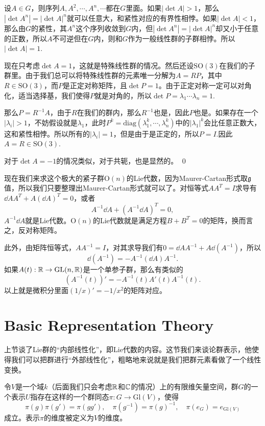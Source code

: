 \proof 设$A\in G$，则序列$A,A^2,\cdots,A^n,\cdots$都在$G$里面。如果$|\det A|>1$，那么$|\det A^n|=|\det A|^n$就可以任意大，和紧性对应的有界性相悖。如果$|\det A|<1$，那么由$G$的紧性，其$A^n$这个序列收敛到$G$内，但$|\det A^n|=|\det A|^n$却又小于任意的正数，所以$A$不可逆但在$G$内，则和$G$作为一般线性群的子群相悖。所以$|\det A|=1$.

现在只考虑$\det A=1$，这就是特殊线性群的情况。然后还设$\mathrm{SO}(3)$在我们的子群里。由于我们总可以将特殊线性群的元素唯一分解为$A=RP$，其中$R\in \mathrm{SO}(3)$，而$P$是正定对称矩阵，且$\det P=1$。由于正定对称一定可以对角化，适当选择基，我们使得$P$就是对角的，所以$\det P=\lambda_1\cdots\lambda_n=1$.

那么$P=R^{-1}A$，由于$R$在我们的群内，那么$R^{-1}$也是，因此$P$也是。如果存在一个$|\lambda_i|>1$，不妨假设就是$\lambda_1$，此时$P^{k}=\mathrm{diag}(\lambda_1^k,\cdots,\lambda_n^k)$中的$|\lambda_1|^k$会比任意正数大，这和紧性相悖。所以所有的$|\lambda_i|=1$，但是由于是正定的，所以$P=I$.因此$A=R\in\mathrm{SO}(3)$.

对于$\det A=-1$的情况类似，对于共轭，也是显然的。 \qed

现在我们来求这个极大的紧子群$\mathrm{O}(n)$的Lie代数，因为Maurer-Cartan形式取${\mathfrak{g}}$值，所以我们只要整理出Maurer-Cartan形式就可以了。对恒等式$AA^T=I$求导有$\dd A A^T+A(\dd A)^T=0$，或者
\[
	A^{-1}\dd A+(A^{-1}\dd A)^T=0,
\]
$A^{-1}\dd A$就是Lie代数。$\mathrm{O}(n)$的Lie代数就是满足方程$B+B^T=0$的矩阵，换而言之，反对称矩阵。

此外，由矩阵恒等式，$AA^{-1}=I$，对其求导我们有$0=\dd A A^{-1}+A\dd(A^{-1})$，所以
\[
	\dd(A^{-1})=-A^{-1}(\dd A) A^{-1}.
\]
如果$A(t):\mathbb{R} \to \mathrm{GL}(n,\mathbb{R})$是一个单参子群，那么有类似的
\[
	(A^{-1}(t))'=-A^{-1}(t)A'(t) A^{-1}(t).
\]
以上就是微积分里面$(1/x)'=-1/x^2$的矩阵对应。

\section{Basic Representation Theory}

上节谈了Lie群的“内部线性化”，即Lie代数的内容。这节我们来谈论群表示，他使得我们可以把群进行“外部线性化”，粗略地来说就是我们把群元素看做了一个线性变换。

\para 令$V$是一个域$k$（后面我们只会考虑$\mathbb{R}$和$\mathbb{C}$的情况）上的有限维矢量空间，群$G$的一个表示$U$指存在这样的一个群同态$\pi:G\rightarrow \mathrm{Gl}(V)$，使得
\[
	\pi(g)\pi(g')=\pi(gg'),\quad \pi(g^{-1})=\pi(g)^{-1},\quad \pi(e_G)=e_{\mathrm{Gl}(V)}
\]
成立。表示$\pi$的维度被定义为$V$的维度。

